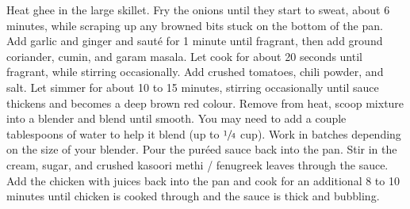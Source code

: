 \begin{recipe}
    \preparation
    {
        \step Heat ghee in the large skillet. Fry the onions until they start to sweat, about 6 minutes, while scraping up any browned bits stuck on the bottom of the pan. 
		\step Add garlic and ginger and saut\'e for 1 minute until fragrant, then add ground coriander, cumin, and garam masala. Let cook for about 20 seconds until fragrant, while stirring occasionally. 
		\step Add crushed tomatoes, chili powder, and salt. Let simmer for about 10 to 15 minutes, stirring occasionally until sauce thickens and becomes a deep brown red colour. 
		\step Remove from heat, scoop mixture into a blender and blend until smooth. You may need to add a couple tablespoons of water to help it blend (up to $\sfrac{1}{4}$ cup). Work in batches depending on the size of your blender.
		\step Pour the pur\'eed sauce back into the pan. Stir in the cream, sugar, and crushed kasoori methi / fenugreek leaves through the sauce. 
		\step Add the chicken with juices back into the pan and cook for an additional 8 to 10 minutes until chicken is cooked through and the sauce is thick and bubbling. 
    }
	


\end{recipe}
